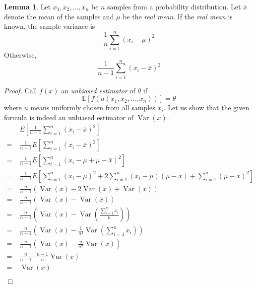 \documentclass[12pt,a4paper,twoside]{article}
\theoremstyle{definition}
\newtheorem{lemma}{Lemma}[section]
\theoremstyle{remark}
\newcommand{\Ex}{E}
\DeclareMathOperator{\Var}{Var}
\begin{document}
    \begin{lemma}
        Let $x_1, x_2, \ldots, x_n$ be $n$ samples from a probability distribution. Let $\bar x$ denote the mean of the samples and $\mu$ be the \textit{real mean}. 
        If the \textit{real mean} is known, the sample variance is 
        \[ \frac 1 n \sum_{i=1}^n (x_i - \mu)^2 \]
        Otherwise,
        \[ \frac 1 {n-1} \sum_{i=1}^n (x_i - \bar x)^2 \]
    \end{lemma}
    \begin{proof}
        Call $f(x)$ an \textit{unbiased estimator} of $\theta$ if 
        \[ \mathbb E[f(u(x_1, x_2, \ldots, x_n))] = \theta \]
        where $u$ means uniformly chosen from all samples $x_i$.
        \clearpage 
        Let us show that the given formula is indeed an unbiased estimator of $\Var(x)$.
        \begin{align*} 
                & \Ex\left[\frac 1 {n-1} \sum_{i=1}^n (x_i - \bar x)^2\right]  \\
            = \; & \frac 1 {n-1} \Ex\left[\sum_{i=1}^n (x_i - \bar x)^2\right]  \\
            = \; & \frac 1 {n-1} \Ex\left[\sum_{i=1}^n (x_i - \mu + \mu - \bar x)^2\right] \\
            = \; & \frac 1 {n-1} \Ex\left[\sum_{i=1}^n (x_i - \mu)^2 + 2 \sum_{i=1}^n (x_i - \mu)(\mu - \bar x) + \sum_{i=1}^n(\mu - \bar x)^2 \right] \\
            = \; & \frac n {n-1} \left(\Var(x) - 2 \Var(\bar x) + \Var(\bar x)\right) \\
            = \; & \frac n {n-1} \left(\Var(x) - \Var(\bar x)\right) \\
            = \; & \frac n {n-1} \left(\Var(x) - \Var\left(\frac{\sum_{i=1}^n x_i}{n}\right)\right) \\
            = \; & \frac n {n-1} \left(\Var(x) - \frac 1 {n^2} \Var\left(\sum_{i=1}^n x_i\right)\right) \\
            = \; & \frac n {n-1} \left(\Var(x) - \frac n {n^2} \Var(x)\right) \\
            = \; & \frac n {n-1} \cdot \frac {n-1} n \Var(x) \\
            = \; & \Var(x) \\
        \end{align*}    
    \end{proof}
\end{document}
